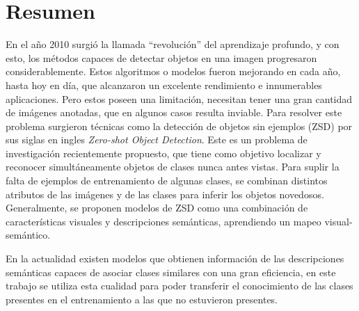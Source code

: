 \documentclass[12pt,twosided]{book}
\begin{document}
\chapter*{Resumen}

\pagestyle{plain}

En el año 2010 surgió la llamada ``revolución'' del aprendizaje profundo, y con esto, los métodos capaces de detectar objetos en una imagen progresaron considerablemente. Estos algoritmos o modelos fueron mejorando en cada año, hasta hoy en día, que alcanzaron un excelente rendimiento e innumerables aplicaciones. Pero estos poseen una limitación, necesitan tener una gran cantidad de imágenes anotadas, que en algunos casos resulta inviable. Para resolver este problema surgieron técnicas como la detección de objetos sin ejemplos (ZSD) por sus siglas en ingles \textit{Zero-shot Object Detection}. Este es un problema de investigación recientemente propuesto, que tiene como objetivo localizar y reconocer simultáneamente objetos de clases nunca antes vistas. Para suplir la falta de ejemplos de entrenamiento de algunas clases, se combinan distintos atributos de las imágenes y de las clases para inferir los objetos novedosos. Generalmente, se proponen modelos de ZSD como una combinación de características visuales y descripciones semánticas, aprendiendo un mapeo visual-semántico. 

En la actualidad existen modelos que obtienen información de las descripciones semánticas capaces de asociar clases similares con una gran eficiencia, en este trabajo se utiliza esta cualidad para poder transferir el conocimiento de las clases presentes en el entrenamiento a las que no estuvieron presentes.
\end{document}
